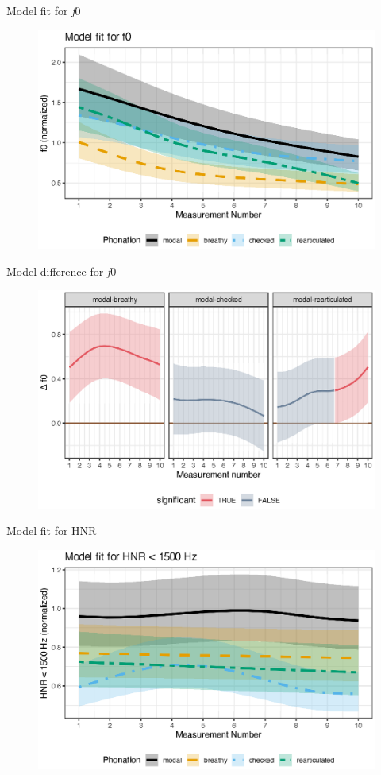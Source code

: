 \documentclass[professionalfont]{beamer}
\begin{document}
\begin{frame}{Model fit for \textit{f}0}
  \begin{figure}[h!]
    \centering
    \includegraphics[width = 0.8\linewidth]{images/LCH_GAMMs/f0_model_fit.eps}
  \end{figure}
\end{frame}

\begin{frame}{Model difference for \textit{f}0}
  \begin{figure}[h!]
    \centering
    \includegraphics[width = 0.8\linewidth]{images/LCH_GAMMs/f0_model_diff.eps}
  \end{figure}
\end{frame}

\begin{frame}{Model fit for HNR}
  \begin{figure}[h!]
    \centering
    \includegraphics[width = 0.8\linewidth]{images/LCH_GAMMs/hnr15_model_fit.eps}
  \end{figure}
\end{frame}
\end{document}
